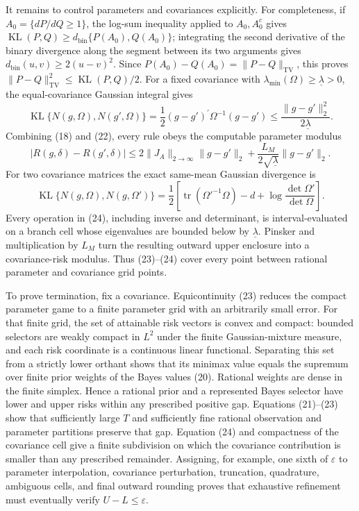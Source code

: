 It remains to control parameters and covariances explicitly.  For completeness, if \(A_0=\{dP/dQ\geq1\}\), the log-sum inequality applied to \(A_0,A_0^c\) gives \(\operatorname{KL}(P,Q)\geq d_{\mathrm{bin}}\{P(A_0),Q(A_0)\}\); integrating the second derivative of the binary divergence along the segment between its two arguments gives \(d_{\mathrm{bin}}(u,v)\geq2(u-v)^2\).  Since \(P(A_0)-Q(A_0)=\lVert P-Q\rVert_{\mathrm{TV}}\), this proves \(\lVert P-Q\rVert_{\mathrm{TV}}^2\leq\operatorname{KL}(P,Q)/2\).  For a fixed covariance with \(\lambda_{\min}(\Omega)\geq\underline\lambda>0\), the equal-covariance Gaussian integral gives
\[
\operatorname{KL}\{N(g,\Omega),N(g',\Omega)\}
=\frac12(g-g')^{\prime}\Omega^{-1}(g-g')
\leq\frac{\lVert g-g'\rVert_2^2}{2\underline\lambda}. \tag{22}
\]
Combining (18) and (22), every rule obeys the computable parameter modulus
\[
|R(g,\delta)-R(g',\delta)|
\leq2\lVert J_A\rVert_{2\to\infty}\lVert g-g'\rVert_2
+\frac{L_M}{2\sqrt{\underline\lambda}}\lVert g-g'\rVert_2. \tag{23}
\]
For two covariance matrices the exact same-mean Gaussian divergence is
\[
\operatorname{KL}\{N(g,\Omega),N(g,\Omega')\}
=\frac12\left[\operatorname{tr}(\Omega'^{-1}\Omega)-d
+\log\frac{\det\Omega'}{\det\Omega}\right]. \tag{24}
\]
Every operation in (24), including inverse and determinant, is interval-evaluated on a branch cell whose eigenvalues are bounded below by \(\underline\lambda\).  Pinsker and multiplication by \(L_M\) turn the resulting outward upper enclosure into a covariance-risk modulus.  Thus (23)--(24) cover every point between rational parameter and covariance grid points.

To prove termination, fix a covariance.  Equicontinuity (23) reduces the compact parameter game to a finite parameter grid with an arbitrarily small error.  For that finite grid, the set of attainable risk vectors is convex and compact: bounded selectors are weakly compact in \(L^2\) under the finite Gaussian-mixture measure, and each risk coordinate is a continuous linear functional.  Separating this set from a strictly lower orthant shows that its minimax value equals the supremum over finite prior weights of the Bayes values (20).  Rational weights are dense in the finite simplex.  Hence a rational prior and a represented Bayes selector have lower and upper risks within any prescribed positive gap.  Equations (21)--(23) show that sufficiently large \(T\) and sufficiently fine rational observation and parameter partitions preserve that gap.  Equation (24) and compactness of the covariance cell give a finite subdivision on which the covariance contribution is smaller than any prescribed remainder.  Assigning, for example, one sixth of \(\varepsilon\) to parameter interpolation, covariance perturbation, truncation, quadrature, ambiguous cells, and final outward rounding proves that exhaustive refinement must eventually verify \(U-L\leq\varepsilon\).

